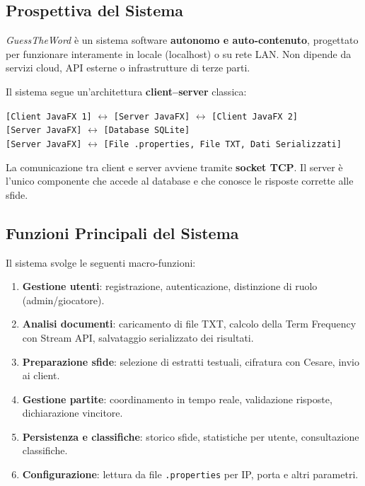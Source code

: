 \documentclass[12pt, a4paper]{article}
\newcommand{\code}[1]{\texttt{#1}}
\begin{document}
\subsection{Prospettiva del Sistema}

\textit{GuessTheWord} è un sistema software \textbf{autonomo e auto-contenuto}, progettato per funzionare interamente in locale (localhost) o su rete LAN. Non dipende da servizi cloud, API esterne o infrastrutture di terze parti.

Il sistema segue un'architettura \textbf{client–server} classica:

\begin{center}
\begin{tcolorbox}[colback=lightBlue, colframe=primaryBlue, width=0.9\linewidth]
\centering
\texttt{[Client JavaFX 1]} $\longleftrightarrow$ \texttt{[Server JavaFX]} $\longleftrightarrow$ \texttt{[Client JavaFX 2]}\\
\vspace{0.3cm}
\texttt{[Server JavaFX]} $\longleftrightarrow$ \texttt{[Database SQLite]}\\
\texttt{[Server JavaFX]} $\longleftrightarrow$ \texttt{[File .properties, File TXT, Dati Serializzati]}
\end{tcolorbox}
\end{center}

La comunicazione tra client e server avviene tramite \textbf{socket TCP}. Il server è l'unico componente che accede al database e che conosce le risposte corrette alle sfide.

\subsection{Funzioni Principali del Sistema}

Il sistema svolge le seguenti macro-funzioni:

\begin{enumerate}[leftmargin=*]
    \item \textbf{Gestione utenti}: registrazione, autenticazione, distinzione di ruolo (admin/giocatore).
    \item \textbf{Analisi documenti}: caricamento di file TXT, calcolo della Term Frequency con Stream API, salvataggio serializzato dei risultati.
    \item \textbf{Preparazione sfide}: selezione di estratti testuali, cifratura con Cesare, invio ai client.
    \item \textbf{Gestione partite}: coordinamento in tempo reale, validazione risposte, dichiarazione vincitore.
    \item \textbf{Persistenza e classifiche}: storico sfide, statistiche per utente, consultazione classifiche.
    \item \textbf{Configurazione}: lettura da file \code{.properties} per IP, porta e altri parametri.
\end{enumerate}
\end{document}
